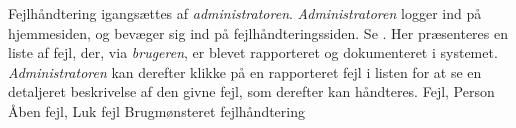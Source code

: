 {Fejlhåndtering igangsættes af \textit{administratoren}. \textit{Administratoren} logger ind på hjemmesiden, og bevæger sig ind på fejlhåndteringssiden. Se . Her præsenteres en liste af  fejl, der, via \textit{brugeren}, er blevet rapporteret og dokumenteret i systemet. \textit{Administratoren} kan derefter klikke på en rapporteret fejl i listen for at se en detaljeret beskrivelse af den givne fejl, som derefter kan håndteres.}
{Fejl, Person}
{Åben fejl, Luk fejl}
{Brugmønsteret fejlhåndtering}

